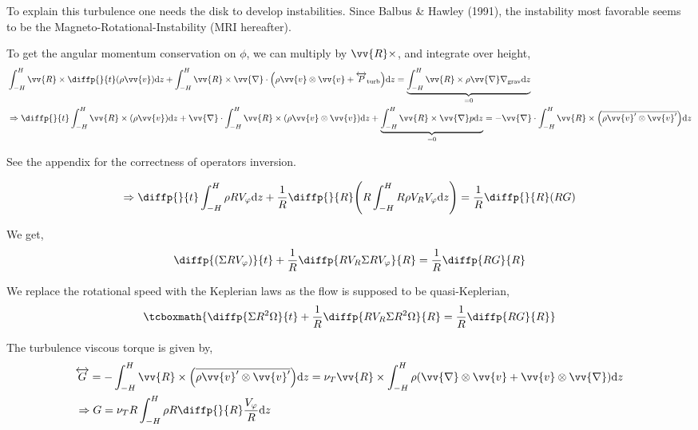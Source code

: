 \documentclass[10pt,a4paper,english]{article}
\let\originalleft\left
\let\originalright\right
\renewcommand{\left}{\mathopen{}\mathclose\bgroup\originalleft}
\renewcommand{\right}{\aftergroup\egroup\originalright}
\begin{document}

To explain this turbulence one needs the disk to develop instabilities. Since
Balbus \& Hawley (1991), the instability most favorable seems to be the
Magneto-Rotational-Instability (MRI hereafter).


To get the angular momentum conservation on $\phi$, we can multiply by $\vv{R}
\times$, and integrate over height,
\begin{align*}
    &\int_{-H}^H \vv{R} \times \diffp{}{t}(\rho \vv{v}) \d{z} +
    \int_{-H}^H \vv{R} \times \vv{\nabla} \cdot \left(\rho \vv{v} \otimes \vv{v} + \tens{P}_\mathrm{turb}\right) \d{z} =
    \underbrace{\int_{-H}^H \vv{R} \times \rho \vv{\nabla} \nabla_\mathrm{grav} \d{z}}_{= 0} \\
    &\Rightarrow \diffp{}{t} \int_{-H}^H \vv{R} \times (\rho \vv{v}) \d{z} +
    \vv{\nabla} \cdot \int_{-H}^H \vv{R} \times \left( \rho \vv{v} \otimes \vv{v} \right) \d{z} +
    \underbrace{\int_{-H}^H \vv{R} \times \vv{\nabla} p \d{z}}_{= 0} =
    - \vv{\nabla} \cdot \int_{-H}^H \vv{R} \times \left(\overline{\rho \vv{v}' \otimes \vv{v}'}\right) \d{z}
\end{align*}

See the appendix for the correctness of operators inversion.


\begin{equation*}
    \Rightarrow \diffp{}{t} \int_{-H}^H \rho R V_\varphi \d{z} + \frac{1}{R} \diffp{}{R} \left( R \int_{-H}^H R \rho V_R V_\varphi \d{z} \right) =
    \frac{1}{R} \diffp{}{R} \left( R G \right)
\end{equation*}

We get,
\begin{equation*}
    \diffp{\left(\Sigma R V_\varphi\right)}{t} + \frac{1}{R} \diffp{R V_R \Sigma R V_\varphi}{R} = \frac{1}{R} \diffp{RG}{R}
\end{equation*}

We replace the rotational speed with the Keplerian laws as the flow is supposed
to be quasi-Keplerian,
\begin{equation}
    \label{eq:alpha_moment}
    \tcboxmath{
        \diffp{\Sigma R^2 \Omega}{t} + \frac{1}{R} \diffp{R V_R \Sigma R^2 \Omega}{R} = \frac{1}{R} \diffp{RG}{R}
    }
\end{equation}

The turbulence viscous torque is given by,
\begin{align*}
    & \overleftrightarrow{G} = - \int_{-H}^H \vv{R} \times \left( \overline{\rho \vv{v}' \otimes \vv{v}'} \right) \d{z} =
    \nu_T \vv{R} \times \int_{-H}^H \rho \left(\vv{\nabla} \otimes \vv{v} + \vv{v} \otimes \vv{\nabla} \right) \d{z} \\
    & \Rightarrow G = \nu_T R \int_{-H}^{H} \rho R \diffp{}{R} \frac{V_\varphi}{R} \d{z}
\end{align*}
\end{document}
